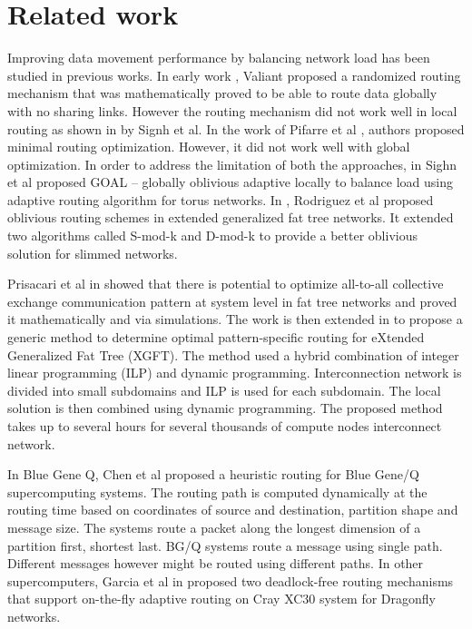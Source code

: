 \section{Related work}
\label{sec:relatedwork}

Improving data movement performance by balancing network load has been studied in previous works. In early work \cite{Valiant81:Routing}, Valiant proposed a randomized routing mechanism that was mathematically proved to be able to route data globally with no sharing links. However the routing mechanism did not work well in local routing as shown in \cite{singh2003:GOAL} by Signh et al. In the work of Pifarre et al \cite{Pifarre91}, authors proposed minimal routing optimization. However, it did not work well with global optimization. In order to address the limitation of both the approaches, in \cite{singh2003:GOAL} Sighn et al proposed GOAL – globally oblivious adaptive locally to balance load using adaptive routing algorithm for torus networks. In \cite{Rodriguez09}, Rodriguez et al proposed oblivious routing schemes in extended generalized fat tree networks. It extended two algorithms called S-mod-k and D-mod-k to provide a better oblivious solution for slimmed networks. 

Prisacari et al in \cite{Prisacari13a} showed that there is potential to optimize all-to-all collective exchange communication pattern at system level in fat tree networks and proved it mathematically and via simulations. The work is then extended in \cite{Prisacari13b} to propose a generic method to determine optimal pattern-specific routing for eXtended Generalized Fat Tree (XGFT). The method used a hybrid combination of integer linear programming (ILP) and dynamic programming. Interconnection network is divided into small subdomains and ILP is used for each subdomain. The local solution is then combined using dynamic programming. The proposed method takes up to several hours for several thousands of compute nodes interconnect network.

In Blue Gene Q, Chen et al \cite{Chen:BGQ} proposed a heuristic routing for Blue Gene/Q supercomputing systems. The routing path is computed dynamically at the routing time based on coordinates of source and destination, partition shape and message size. The systems route a packet along the longest dimension of a partition first, shortest last. BG/Q systems route a message using single path. Different messages however might be routed using different paths. In other supercomputers, Garcia et al in \cite{garcia2013:CrayDragonfly} proposed two deadlock-free routing mechanisms that support on-the-fly adaptive routing on Cray XC30 system for Dragonfly networks.


